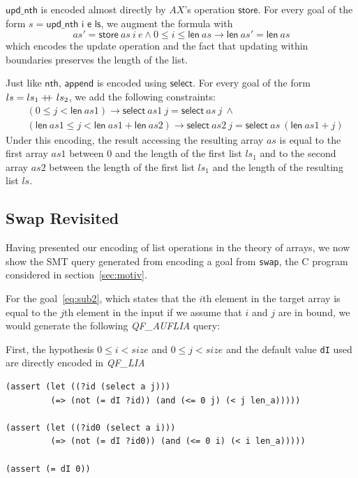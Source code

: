 \documentclass[onecolumn, preprint]{sigplanconf}
\newcommand\doubleplus{+\kern-1.3ex+\kern0.8ex}
\begin{document}
$\textsf{upd\_nth}$ is encoded almost directly by $AX$'s operation $\textsf{store}$. For every goal of the form $s = \textsf{upd\_nth\ i\ e\ ls}$, we augment the formula with
$$ as' = \textsf{store}\ as\ i\ e \wedge 0 \leq i \leq \textsf{len}\ as \to \textsf{len}\ as' = \textsf{len}\ as$$
which encodes the update operation and the fact that updating within boundaries preserves the length of the list.


Just like $\textsf{nth}$, $\textsf{append}$ is encoded using $\textsf{select}$. For every goal of the form $ls = ls_1 \doubleplus ls_2$, we add the following constraints:
\begin{align*}
&(0 \leq j < \textsf{len}\ as1) \to \textsf{select}\ as1\ j = \textsf{select}\ as\ j\ \wedge \\
&(\textsf{len}\ as1 \leq j < \textsf{len}\ as1 + \textsf{len}\ as2) \to \textsf{select}\ as2\ j = \textsf{select}\ as\ (\textsf{len}\ as1 + j)
  \end{align*}
Under this encoding, the result accessing the resulting array $as$ is equal to the first array $as1$ between $0$ and the length of the first list $ls_1$ and to the second array $as2$ between the length of the first list $ls_1$ and the length of the resulting list $ls$.


\subsection{Swap Revisited}

Having presented our encoding of list operations in the theory of arrays, we now show the SMT query generated from encoding a goal from \texttt{swap}, the C program considered in section~\ref{sec:motiv}. 

For the goal~\ref{eq:sub2}, which states that the $i$th element in the target array is equal to the $j$th element in the input if we assume that $i$ and $j$ are in bound, we would generate the following \emph{QF\_AUFLIA} query:

First, the hypothesis $0 \leq i < size$ and $0 \leq j < size$ and the default value \texttt{dI} used are directly encoded in \emph{QF\_LIA}
\begin{lstlisting}
(assert (let ((?id (select a j)))
         (=> (not (= dI ?id)) (and (<= 0 j) (< j len_a)))))

(assert (let ((?id0 (select a i)))
         (=> (not (= dI ?id0)) (and (<= 0 i) (< i len_a)))))

(assert (= dI 0)) 
\end{lstlisting}
\end{document}

